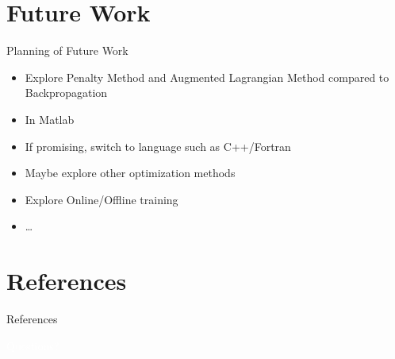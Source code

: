 \documentclass[11pt,t]{beamer}
\begin{document}
\section{Future Work}
\begin{frame}{Planning of Future Work}
   \begin{itemize}
   \itemsep 10pt
   \item Explore Penalty Method and Augmented Lagrangian Method compared to Backpropagation
   \item In Matlab
   \item If promising, switch to language such as C++/Fortran
   \item Maybe explore other optimization methods
   \item Explore Online/Offline training
   \item \ldots
   \end{itemize}
\end{frame}

\section{References}

\begin{frame}{References}

{}

\end{frame}


\begin{frame}

\centering
\textcolor{white}{\huge Questions?}
\end{frame}
\end{document}
